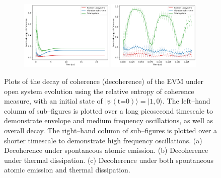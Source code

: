 \documentclass[11pt]{article}
\newcounter{subsubsubsection}[subsubsection]
\begin{document}
\begin{figure}[H]
    \vspace{0.8em}

    \begin{subfigure}{\textwidth}
        \centering
        \includegraphics[width=0.49\textwidth]{Research Project/Code/results/ExVib/Open/Coherence/Envelope/coh_both_e0.png}
        \hfill
        \includegraphics[width=0.49\textwidth]{Research Project/Code/results/ExVib/Open/Coherence/Fast/coh_both_e0.png}
        \caption{}
        \label{fig:EVM_OQS_Coh_both_e0}
    \end{subfigure}
    \caption{Plots of the decay of coherence (decoherence) of the EVM under open system evolution using the relative entropy of coherence measure, with an initial state of $|\psi (\text{t=0})\rangle =|1, 0\rangle$. The left--hand column of sub--figures is plotted over a long picosecond timescale to demonstrate envelope and medium frequency oscillations, as well as overall decay. The right--hand column of sub--figures is plotted over a shorter timescale to demonstrate high frequency oscillations. (a) Decoherence under spontaneous atomic emission. (b) Decoherence under thermal dissipation. (c) Decoherence under both spontaneous atomic emission and thermal dissipation.}
    \label{fig:EVM_OQS_Coh_e0}
\end{figure}


\end{document}
